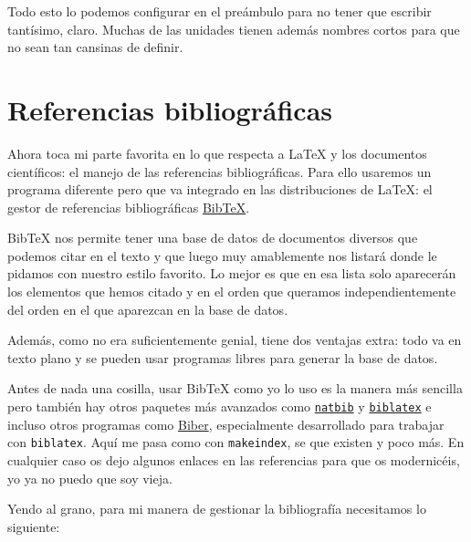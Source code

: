 Todo esto lo podemos configurar en el preámbulo para no tener que
escribir tantísimo, claro. Muchas de las unidades tienen además nombres
cortos para que no sean tan cansinas de definir.

\section{Referencias bibliográficas}

Ahora toca mi parte favorita en lo que respecta a LaTeX y los documentos
científicos: el manejo de las referencias bibliográficas. Para ello
usaremos un programa diferente pero que va integrado en las
distribuciones de LaTeX: el gestor de referencias bibliográficas
\href{http://www.bibtex.org/}{BibTeX}.

BibTeX nos permite tener una base de datos de documentos diversos que
podemos citar en el texto y que luego muy amablemente nos listará donde
le pidamos con nuestro estilo favorito. Lo mejor es que en esa lista
solo aparecerán los elementos que hemos citado y en el orden que
queramos independientemente del orden en el que aparezcan en la base de
datos.

Además, como no era suficientemente genial, tiene dos ventajas extra:
todo va en texto plano y se pueden usar programas libres para generar la
base de datos.

Antes de nada una cosilla, usar BibTeX como yo lo uso es la manera más
sencilla pero también hay otros paquetes más avanzados como
\href{http://ctan.org/pkg/natbib}{\lstinline!natbib!} y
\href{http://ctan.org/pkg/biblatex}{\lstinline!biblatex!} e incluso
otros programas como
\href{http://biblatex-biber.sourceforge.net/}{Biber}, especialmente
desarrollado para trabajar con \lstinline!biblatex!. Aquí me pasa como
con \lstinline!makeindex!, se que existen y poco más. En cualquier caso
os dejo algunos enlaces en las referencias para que os modernicéis, yo
ya no puedo que soy vieja.

Yendo al grano, para mi manera de gestionar la bibliografía necesitamos
lo siguiente:

